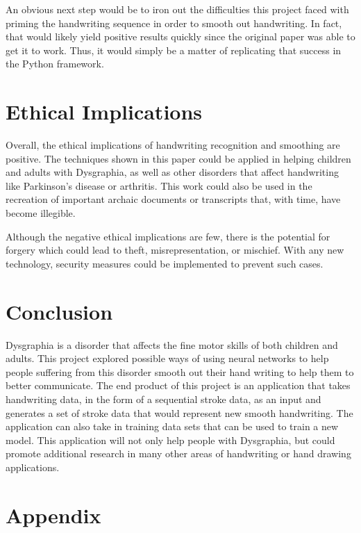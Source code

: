 \documentclass{article}
\begin{document}
An obvious next step would be to iron out the difficulties this project faced with priming the handwriting sequence in order to smooth out handwriting.  In fact, that would likely yield positive results quickly since the original paper \cite{DBLP:journals/corr/Graves13} was able to get it to work.  Thus, it would simply be a matter of replicating that success in the Python framework.

\section{Ethical Implications}
Overall, the ethical implications of handwriting recognition and smoothing are positive. The techniques shown in this paper could be applied in helping children and adults with Dysgraphia, as well as other disorders that affect handwriting like Parkinson's disease or arthritis. This work could also be used in the recreation of important archaic documents or transcripts that, with time, have become illegible.

Although the negative ethical implications are few, there is the potential for forgery which could lead to theft, misrepresentation, or mischief. With any new technology, security measures could be implemented to prevent such cases.

\section{Conclusion}
Dysgraphia is a disorder that affects the fine motor skills of both children and adults. This project explored possible ways of using neural networks to help people suffering from this disorder smooth out their hand writing to help them to better communicate. The end product of this project is an application that takes handwriting data, in the form of a sequential stroke data, as an input and generates a set of stroke data that would represent new smooth handwriting. The application can also take in training data sets that can be used to train a new model. This application will not only help people with Dysgraphia, but could promote additional research in many other areas of handwriting or hand drawing applications.

\medskip



\appendix
\section{Appendix}
\end{document}
